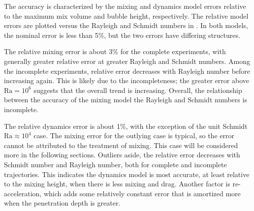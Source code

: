 The accuracy is characterized by the mixing and dynamics model errors relative to the maximum mix volume and bubble height, respectively.
The relative model errors are plotted versus the Rayleigh and Schmidt numbers in .
In both models, the nominal error is less than 5\%, but the two errors have differing structures.

The relative mixing error is about 3\% for the complete experiments, with generally greater relative error at greater Rayleigh and Schmidt numbers.
Among the incomplete experiments, relative error decreases with Rayleigh number before increasing again.
This is likely due to the incompleteness; the greater error above $\text{Ra} = 10^6$ suggests that the overall trend is increasing.
Overall, the relationship between the accuracy of the mixing model the Rayleigh and Schmidt numbers is incomplete.

The relative dynamics error is about 1\%, with the exception of the unit Schmidt $\text{Ra} \approx 10^4$ case.
The mixing error for the outlying case is typical, so the error cannot be attributed to the treatment of mixing.
This case will be considered more in the following sections.
Outliers aside, the relative error decreases with Schmidt number and Rayleigh number, both for complete and incomplete trajectories.
This indicates the dynamics model is most accurate, at least relative to the mixing height, when there is less mixing and drag.
Another factor is re-acceleration, which adds some relatively constant error that is amortized more when the penetration depth is greater.

